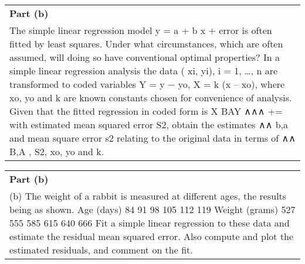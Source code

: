 \documentclass[a4paper,12pt]{article}
\begin{document}
\begin{table}[ht!]
     \centering
     \begin{tabular}{|p{15cm}|}
     \hline        
 \noindent \textbf{Part (b)}\\
\noindent 
 The simple linear regression model y = a  + b x + error is often fitted by least squares.  Under what circumstances, which are often assumed, will doing so have conventional optimal properties?
In a simple linear regression analysis the data ( xi, yi), i = 1, …, n are transformed to coded variables Y = y − yo, X = k (x – xo), where xo, yo and k are known constants chosen for convenience of analysis. Given that the fitted regression in coded form is
 X BAY ∧∧∧ +=
with estimated mean squared error S2, obtain the estimates 
∧∧ b,a and mean square
error s2 relating to the original data in terms of 
∧∧ B,A , S2, xo, yo and k.
\\ \hline
 \end{tabular}
\end{table}
\begin{table}[ht!]
     \centering
     \begin{tabular}{|p{15cm}|}
     \hline        
 \noindent \textbf{Part (b)}\\
\noindent (b) The weight of a rabbit is measured at different ages, the results being as shown.
Age (days)  84  91  98 105 112 119 Weight (grams) 527 555 585 615 640 666
Fit a simple linear regression to these data and estimate the residual mean squared error.  Also compute and plot the estimated residuals, and comment on the fit.

\\ \hline
 \end{tabular}
\end{table}
\end{document}
